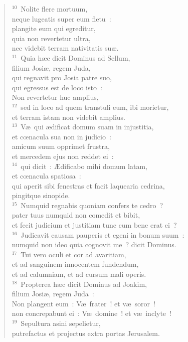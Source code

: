 \begin{flushleft}
\begin{verse}
${}^{10}$~Nolite flere mortuum,\\ neque lugeatis super eum fletu~:\\ plangite eum qui egreditur,\\ quia non revertetur ultra,\\ nec videbit terram nativitatis su\ae .\\
${}^{11}$~Quia h\ae c dicit Dominus ad Sellum,\\ filium Josi\ae , regem Juda,\\ qui regnavit pro Josia patre suo,\\ qui egressus est de loco isto~:\\ Non revertetur huc amplius,\\
${}^{12}$~sed in loco ad quem transtuli eum, ibi morietur,\\ et terram istam non videbit amplius.\\
${}^{13}$~V\ae\ qui \ae dificat domum suam in injustitia,\\ et cœnacula sua non in judicio~:\\ amicum suum opprimet frustra,\\ et mercedem ejus non reddet ei~:\\
${}^{14}$~qui dicit~: \AE dificabo mihi domum latam,\\ et cœnacula spatiosa~:\\ qui aperit sibi fenestras et facit laquearia cedrina,\\ pingitque sinopide.\\
${}^{15}$~Numquid regnabis quoniam confers te cedro~?\\ pater tuus numquid non comedit et bibit,\\ et fecit judicium et justitiam tunc cum bene erat ei~?\\
${}^{16}$~Judicavit causam pauperis et egeni in bonum suum~:\\ numquid non ideo quia cognovit me~? dicit Dominus.\\
${}^{17}$~Tui vero oculi et cor ad avaritiam,\\ et ad sanguinem innocentem fundendum,\\ et ad calumniam, et ad cursum mali operis.\\
${}^{18}$~Propterea h\ae c dicit Dominus ad Joakim,\\ filium Josi\ae , regem Juda~:\\ Non plangent eum~: V\ae\ frater~! et v\ae\ soror~!\\ non concrepabunt ei~: V\ae\ domine~! et v\ae\ inclyte~!\\
${}^{19}$~Sepultura asini sepelietur,\\ putrefactus et projectus extra portas Jerusalem.\end{verse}\end{flushleft}


